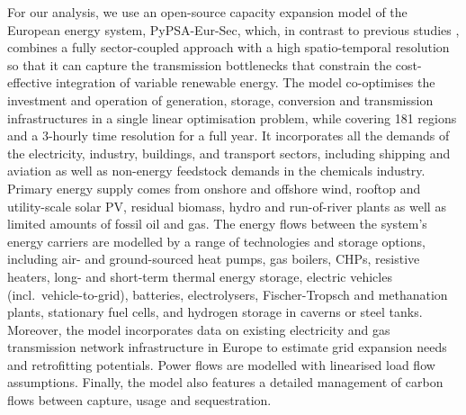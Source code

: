 For our analysis, we use an open-source capacity expansion model of the European
energy system, PyPSA-Eur-Sec, which, in contrast to previous studies
\cite{henningComprehensiveModel2014,mathiesenSmartEnergy2015,connollySmartEnergy2016,lofflerDesigningModel2017,blancoPotentialHydrogen2018,brownSynergiesSector2018,in-depth_2018,victoria2020},
combines a fully sector-coupled approach with a high spatio-temporal resolution
so that it can capture the transmission bottlenecks that constrain the
cost-effective integration of variable renewable energy.
The model co-optimises the investment and operation of generation, storage,
conversion and transmission infrastructures in a single linear optimisation
problem, while covering 181 regions and a 3-hourly time resolution for a full
year.
It incorporates all the demands of the electricity, industry, buildings, and
transport sectors, including shipping and aviation as well as non-energy
feedstock demands in the chemicals industry.
Primary energy supply comes from onshore and offshore wind, rooftop and
utility-scale solar PV, residual biomass, hydro and run-of-river plants as well
as limited amounts of fossil oil and gas.
The energy flows between the system's energy carriers are modelled by a range of
technologies and storage options, including air- and ground-sourced heat pumps,
gas boilers, CHPs, resistive heaters, long- and short-term thermal energy
storage, electric vehicles (incl.~vehicle-to-grid), batteries, electrolysers,
Fischer-Tropsch and methanation plants, stationary fuel cells, and hydrogen
storage in caverns or steel tanks.
Moreover, the model incorporates data on existing electricity and gas transmission
network infrastructure in Europe to estimate grid expansion needs and retrofitting
potentials. Power flows are modelled with linearised load flow assumptions.
Finally, the model also features a detailed management of carbon flows between
capture, usage and sequestration.


